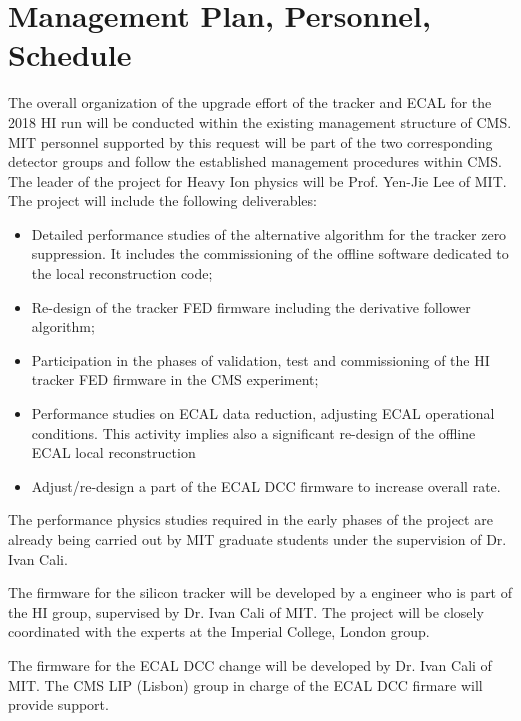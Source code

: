 \section{Management Plan, Personnel, Schedule}
\label{sec:management}

The overall organization of the upgrade effort of the tracker and ECAL for the 2018 HI run will be conducted within the existing management structure of CMS. MIT personnel supported by this request will be part of the two corresponding detector groups and follow the established management procedures within CMS. The leader of the project for Heavy Ion physics will be Prof. Yen-Jie Lee of MIT. The project will include the following deliverables:

\begin{itemize}
\item Detailed performance studies of the alternative algorithm for the tracker zero suppression. It includes the commissioning of the offline software dedicated to the local reconstruction code;
\item Re-design of the tracker FED firmware including the derivative follower algorithm;
\item Participation in the phases of validation, test and commissioning of the HI tracker FED firmware in the CMS experiment;
\item Performance studies on ECAL data reduction, adjusting ECAL operational conditions. This activity implies also a significant re-design of the offline ECAL local reconstruction
\item Adjust/re-design a part of the ECAL DCC firmware to increase overall rate.
\end{itemize}

The performance physics studies required in the early phases of the project are already being carried out by MIT graduate students under the supervision of Dr. Ivan Cali. 

 
The firmware for the silicon tracker will be developed by a engineer who is part of the HI group,  supervised by Dr. Ivan Cali of MIT. The project will be closely coordinated with the experts at the Imperial College, London group.

The firmware for the ECAL DCC change will be developed by Dr. Ivan Cali of MIT. The CMS LIP (Lisbon) group in charge of the ECAL DCC firmare will provide support.

